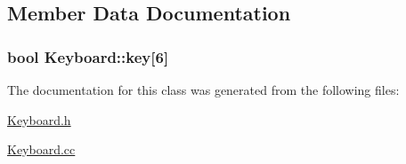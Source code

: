 \subsection{Member Data Documentation}
\hypertarget{classKeyboard_aad6d0d22cffc14a293b3a3b6a98da05d}{
\subsubsection[{key}]{\setlength{\rightskip}{0pt plus 5cm}bool {\bf Keyboard::key}\mbox{[}6\mbox{]}}}
\label{classKeyboard_aad6d0d22cffc14a293b3a3b6a98da05d}


The documentation for this class was generated from the following files:\begin{DoxyCompactItemize}
\item 
\hyperlink{Keyboard_8h}{Keyboard.h}\item 
\hyperlink{Keyboard_8cc}{Keyboard.cc}\end{DoxyCompactItemize}
